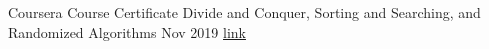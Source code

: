 

\begin{cvcertificates}

\cvcertificate
{Coursera Course Certificate} %
{Divide and Conquer, Sorting and Searching, and Randomized Algorithms} %
{Nov 2019} %
{\href{https://www.coursera.org/account/accomplishments/verify/ZSWGXT5RRQDG}{link}}

\end{cvcertificates}

